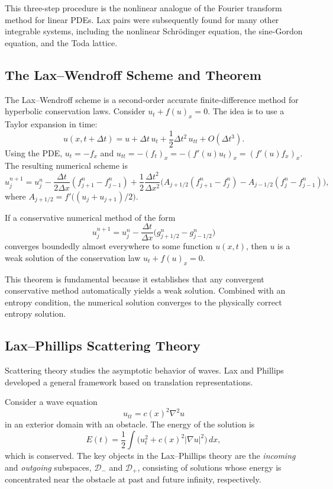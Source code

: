 This three-step procedure is the nonlinear analogue of the Fourier transform method for linear PDEs. Lax pairs were subsequently found for many other integrable systems, including the nonlinear Schr\"odinger equation, the sine-Gordon equation, and the Toda lattice.

\subsection{The Lax--Wendroff Scheme and Theorem}

The Lax--Wendroff scheme is a second-order accurate finite-difference method for hyperbolic conservation laws. Consider \(u_t + f(u)_x = 0\). The idea is to use a Taylor expansion in time:
\[
u(x, t + \Delta t) = u + \Delta t\, u_t + \frac12 \Delta t^2\, u_{tt} + O(\Delta t^3).
\]
Using the PDE, \(u_t = -f_x\) and \(u_{tt} = -(f_t)_x = -(f'(u) u_t)_x = (f'(u) f_x)_x\). The resulting numerical scheme is
\[
u_j^{n+1} = u_j^n - \frac{\Delta t}{2\Delta x}(f_{j+1}^n - f_{j-1}^n) + \frac12 \frac{\Delta t^2}{\Delta x^2}\bigl(A_{j+1/2}(f_{j+1}^n - f_j^n) - A_{j-1/2}(f_j^n - f_{j-1}^n)\bigr),
\]
where \(A_{j+1/2} = f'\bigl((u_j + u_{j+1})/2\bigr)\).

\begin{theorem}
If a conservative numerical method of the form
\[
u_j^{n+1} = u_j^n - \frac{\Delta t}{\Delta x}\bigl(g_{j+1/2}^n - g_{j-1/2}^n\bigr)
\]
converges boundedly almost everywhere to some function \(u(x,t)\), then \(u\) is a weak solution of the conservation law \(u_t + f(u)_x = 0\).
\end{theorem}

This theorem is fundamental because it establishes that any convergent conservative method automatically yields a weak solution. Combined with an entropy condition, the numerical solution converges to the physically correct entropy solution.

\subsection{Lax--Phillips Scattering Theory}

Scattering theory studies the asymptotic behavior of waves. Lax and Phillips developed a general framework based on translation representations.

Consider a wave equation
\[
u_{tt} = c(x)^2 \nabla^2 u
\]
in an exterior domain with an obstacle. The energy of the solution is
\[
E(t) = \frac12 \int \bigl(u_t^2 + c(x)^2 |\nabla u|^2\bigr)\,dx,
\]
which is conserved. The key objects in the Lax--Phillips theory are the \textit{incoming} and \textit{outgoing} subspaces, \(\mathcal{D}_-\) and \(\mathcal{D}_+\), consisting of solutions whose energy is concentrated near the obstacle at past and future infinity, respectively.

